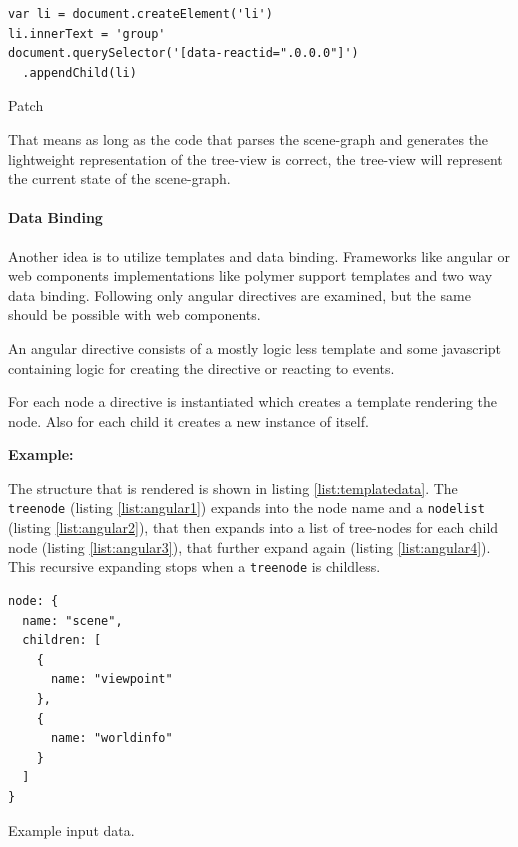 \begin{listing}[H]
  \begin{verbatim}
var li = document.createElement('li')
li.innerText = 'group'
document.querySelector('[data-reactid=".0.0.0"]')
  .appendChild(li)
  \end{verbatim}
  \caption{Patch}
  \label{patch}
\end{listing}

That means as long as the code that parses the scene-graph and generates the
lightweight representation of the tree-view is correct, the tree-view will
represent the current state of the scene-graph.

\paragraph{Data Binding}
\label{data-binding}

Another idea is to utilize templates and data binding. Frameworks like
angular or web components implementations like polymer
support templates and two way data binding. Following only
angular directives are examined, but the same should be possible with web
components.

An angular directive consists of a mostly logic less template and some
javascript containing logic for creating the directive or reacting to
events.

For each node a directive is instantiated which creates a template
rendering the node. Also for each child it creates a new instance of
itself.

\textbf{Example:}

The structure that is rendered is shown in listing \ref{list:templatedata}. The
\texttt{treenode} (listing \ref{list:angular1}) expands into the node name and a
\texttt{nodelist} (listing \ref{list:angular2}), that then expands into a list
of tree-nodes for each child node (listing \ref{list:angular3}), that further
expand again (listing \ref{list:angular4}). This recursive expanding stops when a
\texttt{treenode} is childless.

\begin{listing}[H]
  \begin{verbatim}
node: {
  name: "scene",
  children: [
    {
      name: "viewpoint"
    },
    {
      name: "worldinfo"
    }
  ]
}
  \end{verbatim}
  \caption{Example input data.}
  \label{list:templatedata}
\end{listing}

